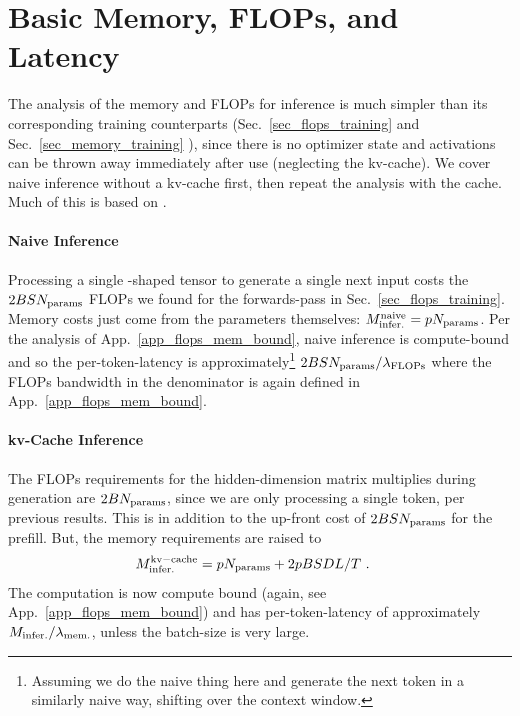 \documentclass[11pt]{article}
\begin{document}
\section{Basic Memory, FLOPs, and Latency}

The analysis of the memory and FLOPs for inference is much simpler than its corresponding training
counterparts (Sec.~\ref{sec_flops_training} and Sec.~\ref{sec_memory_training}  ), since there is no
optimizer state and activations can be thrown away immediately after use (neglecting the kv-cache).
We cover naive inference without a kv-cache first, then repeat the analysis with the cache. Much of
this is based on \cite{kipply_inference_math}.

\paragraph{Naive Inference} Processing a single -shaped tensor to generate a single
next input costs the $ 2BSN _{ {\rm params}  } $ FLOPs we found for the forwards-pass in
Sec.~\ref{sec_flops_training}. Memory costs just come from the parameters themselves: $ M _{ {\rm
infer.}  }^{ {\rm naive}  }=pN _{ {\rm params}  } $. Per the analysis of App.~\ref{app_flops_mem_bound},
naive inference is compute-bound and so the per-token-latency is approximately\footnote{Assuming we
do the naive thing here and generate the next token in a similarly naive way, shifting over the
context window.}  $  2BSN _{ {\rm params}  }/ \lambda _{ {\rm FLOPs}  } $ where the FLOPs bandwidth
in the denominator is again defined in App.~\ref{app_flops_mem_bound}.

\paragraph{kv-Cache Inference}
The FLOPs requirements for the hidden-dimension matrix multiplies during generation are $2BN _{ {\rm params}  } $,
since we are only processing a single token, per previous results.   This is in addition to the up-front cost of $ 2BSN _{
{\rm params}} $ for the prefill. But, the memory requirements are raised to \begin{align} M _{ {\rm
infer.}  }^{ {\rm kv-cache}  } &=pN _{ {\rm params}  } + 2pBSDL/T\ . \end{align} The computation is
now compute bound (again, see App.~\ref{app_flops_mem_bound}) and has per-token-latency of
approximately $ M _{ {\rm infer.} }/ \lambda _{ {\rm mem.} }$, unless the batch-size is very large.
\end{document}
